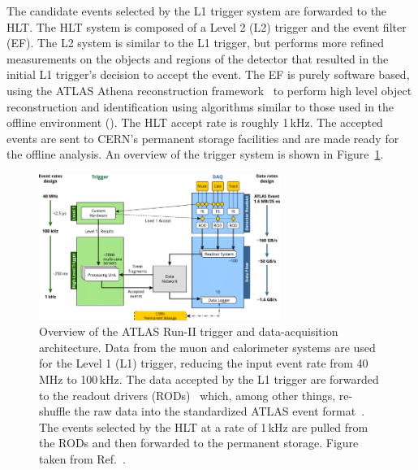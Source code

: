 The candidate events selected by the L1 trigger system are forwarded to the HLT.
The HLT system is composed of a Level 2 (L2) trigger and the event filter (EF).
The L2 system is similar to the L1 trigger, but performs more refined measurements on the objects and
regions of the detector that resulted in the initial L1 trigger's decision to accept the event.
The EF is purely software based, using the ATLAS Athena reconstruction framework~\cite{AthenaRef}
to perform high level object reconstruction and identification using algorithms similar to those used
in the offline environment ({\color{red}{Section XXX}}).
The HLT accept rate is roughly 1\,kHz.
The accepted events are sent to CERN's permanent storage facilities and are made ready for the offline analysis.
An overview of the trigger system is shown in Figure~\ref{fig:run2_trigger}.


\begin{figure}[!htb]
    \begin{center}
        \includegraphics[width=0.7\textwidth]{figures/chapter2/tdaq/atlas_run2_trigger_system}
        \caption{
            Overview of the ATLAS Run-II trigger and data-acquisition architecture.
            Data from the muon and calorimeter systems are used for the Level 1 (L1) trigger, reducing
            the input event rate from 40\,MHz to 100\,kHz.
            The data accepted by the L1 trigger are forwarded to the readout drivers (RODs)~\cite{Jenni:616089}
            which, among other things, re-shuffle the raw data into the standardized ATLAS event format~\cite{Bee:683741}.
            The events selected by the HLT at a rate of 1\,kHz are pulled from the RODs and then forwarded to the permanent
            storage.
            Figure taken from Ref.~\cite{PanduroVazquez:2244345}.
        }
        \label{fig:run2_trigger}
    \end{center}
\end{figure}

